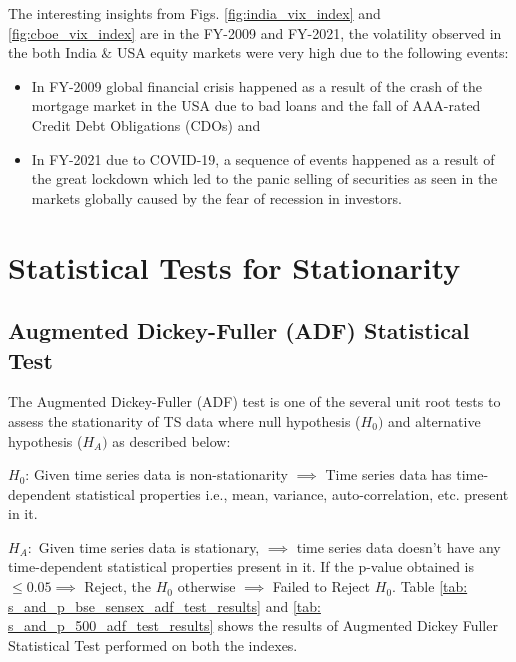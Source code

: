 \documentclass[conference]{IEEEtran}
\begin{document}
\twocolumn

The interesting insights from Figs. \ref{fig:india_vix_index} and \ref{fig:cboe_vix_index} are in the FY-2009 and FY-2021, the volatility observed in the both India \& USA equity markets were very high due to the following events:
\begin{itemize}
    \item In FY-2009 global financial crisis happened as a result of the crash of the mortgage market in the USA due to bad loans and the fall of AAA-rated Credit Debt Obligations (CDOs) and 
    \item In FY-2021 due to COVID-19, a sequence of events happened as a result of the great lockdown which led to the panic selling of securities as seen in the markets globally caused by the fear of recession in investors.
\end{itemize}

\section{Statistical Tests for Stationarity} \label{statistical_tests}
\subsection{Augmented Dickey-Fuller (ADF) Statistical Test}
The Augmented Dickey-Fuller (ADF) test is one of the several unit root tests to assess the stationarity of TS data where null hypothesis ($H_{0})$ and alternative hypothesis ($H_{A})$ as described below:

$H_{0}$: Given time series data is non-stationarity $\implies$ Time series data has time-dependent statistical properties i.e., mean, variance, auto-correlation, etc. present in it.

$H_{A}:$ Given time series data is stationary, $\implies$ time series data doesn't have any time-dependent statistical properties present in it. \newline
If the p-value obtained is $\le 0.05 \implies$ Reject, the $H_{0}$ otherwise $\implies$ Failed to Reject $H_{0}.$ \newline
Table \ref{tab: s_and_p_bse_sensex_adf_test_results} and \ref{tab: s_and_p_500_adf_test_results} shows the results of Augmented Dickey Fuller Statistical Test performed on both the indexes.

\begin{table}[htbp]
    \centering
	\caption{S\&P BSE SENSEX Augmented Dickey Fuller Test Results}
	\label{tab: s_and_p_bse_sensex_adf_test_results}
\end{table}
\end{document}
